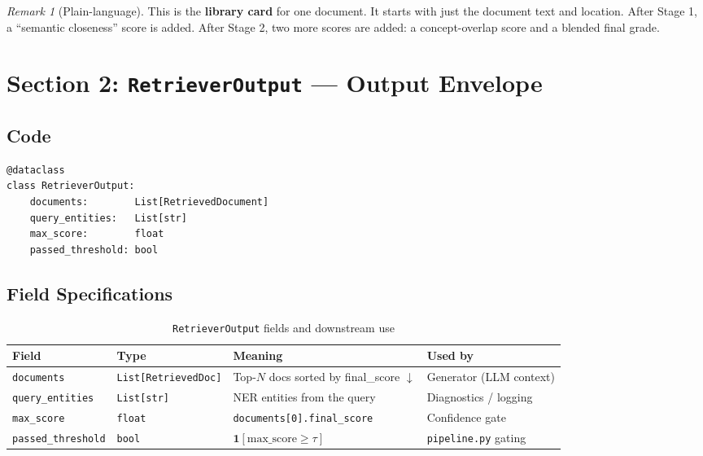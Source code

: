 \documentclass[12pt,a4paper]{article}
\theoremstyle{definition}
\theoremstyle{remark}
\newtheorem{remark}[theorem]{Remark}
\begin{document}
\begin{remark}[Plain-language]
This is the \textbf{library card} for one document.
It starts with just the document text and location.
After Stage 1, a ``semantic closeness'' score is added.
After Stage 2, two more scores are added: a concept-overlap score
and a blended final grade.
\end{remark}

\section{Section 2: \texttt{RetrieverOutput} --- Output Envelope}

\subsection{Code}

\begin{lstlisting}[caption={\texttt{RetrieverOutput} dataclass}]
@dataclass
class RetrieverOutput:
    documents:        List[RetrievedDocument]
    query_entities:   List[str]
    max_score:        float
    passed_threshold: bool
\end{lstlisting}

\subsection{Field Specifications}

\begin{table}[H]
\centering
\caption{\texttt{RetrieverOutput} fields and downstream use}
\begin{tabularx}{\textwidth}{llXl}
\toprule
Field & Type & Meaning & Used by \\
\midrule
\texttt{documents}        & \texttt{List[RetrievedDoc]} & Top-$N$ docs sorted by final\_score $\downarrow$ & Generator (LLM context) \\
\texttt{query\_entities}  & \texttt{List[str]}          & NER entities from the query & Diagnostics / logging \\
\texttt{max\_score}       & \texttt{float}              & \texttt{documents[0].final\_score} & Confidence gate \\
\texttt{passed\_threshold}& \texttt{bool}               & $\mathbf{1}[\text{max\_score} \geq \tau]$ & \texttt{pipeline.py} gating \\
\bottomrule
\end{tabularx}
\end{table}
\end{document}
